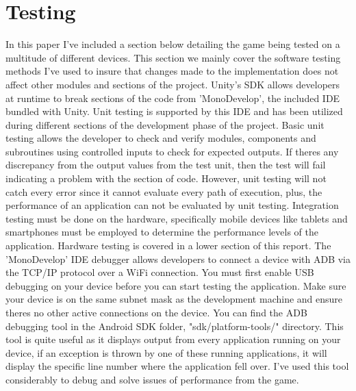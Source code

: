 \section{Testing}
In this paper I've included a section below detailing the game being tested on a multitude of different devices. This section we mainly cover the software testing methods I've used to insure that changes made to the implementation does not affect other modules and sections of the project.
Unity's SDK allows developers at runtime to break sections of the code from 'MonoDevelop', the included IDE bundled with Unity. Unit testing is supported by this IDE and has been utilized during different sections of the development phase of the project. Basic unit testing allows the developer to check and verify modules, components and subroutines using controlled inputs to check for expected outputs. If theres any discrepancy from the output values from the test unit, then the test will fail indicating a problem with the section of code. However, unit testing will not catch every error since it cannot evaluate every path of execution, plus, the performance of an application can not be evaluated by unit testing. Integration testing must be done on the hardware, specifically mobile devices like tablets and smartphones must be employed to determine the performance levels of the application. Hardware testing is covered in a lower section of this report.
The 'MonoDevelop' IDE debugger allows developers to connect a device with ADB via the TCP/IP protocol over a WiFi connection. You must first enable USB debugging on your device before you can start testing the application. Make sure your device is on the same subnet mask as the development machine and ensure theres no other active connections on the device. You can find the ADB debugging tool in the Android SDK folder, "sdk/platform-tools/" directory. This tool is quite useful as it displays output from every application running on your device, if an exception is thrown by one of these running applications, it will display the specific line number where the application fell over. I've used this tool considerably to debug and solve issues of performance from the game.

